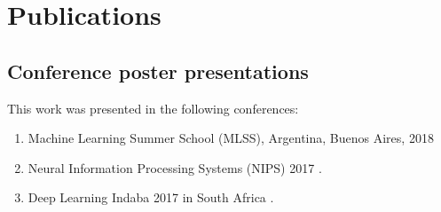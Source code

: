 \chapter*{Publications}

\section*{Conference poster presentations}

This work was presented in the following conferences:
\begin{enumerate}
\item Machine Learning Summer School (MLSS), Argentina, Buenos Aires, 2018  \citep{MLSS}
\item Neural Information Processing Systems (NIPS) 2017 \citep{NIPS}.
\item Deep Learning Indaba 2017 in South Africa \citep{DLI}.



\end{enumerate} 

 